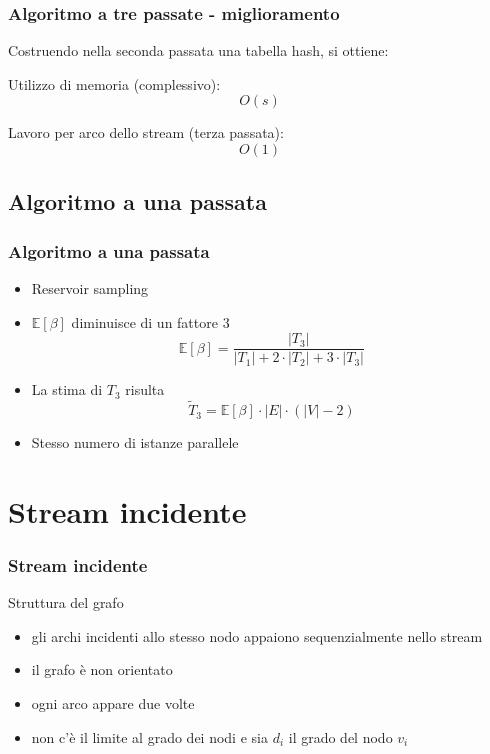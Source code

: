 \documentclass{beamer}
\begin{document}
\begin{frame}
\frametitle{Algoritmo a tre passate - miglioramento}

Costruendo nella seconda passata una tabella hash, si ottiene:

Utilizzo di memoria (complessivo):
\[
    O \left( s \right)
\]

Lavoro per arco dello stream (terza passata):
\[
    O ( 1 )
\]

\end{frame}

\subsection{Algoritmo a una passata}

\begin{frame}
\frametitle{Algoritmo a una passata}

\begin{itemize}
    \item Reservoir sampling
    \item $ \mathbb{E} [\beta] $ diminuisce di un fattore 3
        \[
            \mathbb{E}[\beta]=\frac{\left|T_{3}\right|}{\left|T_{1}\right|+2 \cdot\left|T_{2}\right|+3 \cdot\left|T_{3}\right|}
        \]
    \item La stima di $T_3$ risulta
        \[
            \widetilde T_{3}
            =\mathbb{E}
            [\beta] \cdot|E| \cdot (|V|-2)
        \]
    \item Stesso numero di istanze parallele
\end{itemize}

\end{frame}



\section{Stream incidente}

\begin{frame}
\frametitle{Stream incidente}
Struttura del grafo
\begin{itemize}
    \item gli archi incidenti allo stesso nodo appaiono sequenzialmente nello stream
    \item il grafo è non orientato
    \item ogni arco appare due volte
    \item non c’è il limite al grado dei nodi e sia $d_i$ il grado del nodo $v_i$
\end{itemize}

\end{frame}
\end{document}
